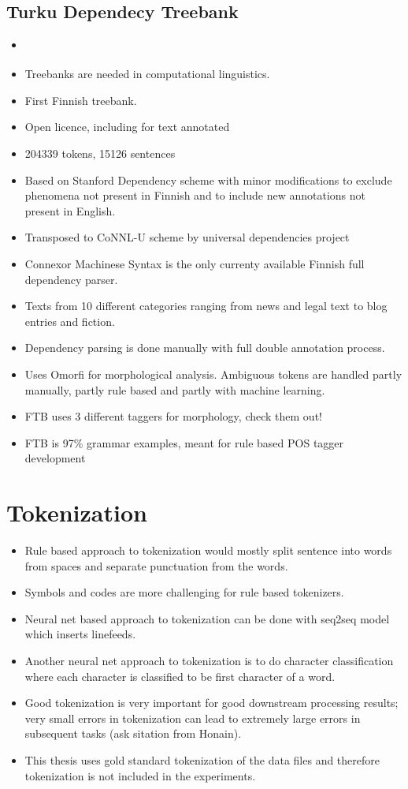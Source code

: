\documentclass[12pt,a4paper,english
]{tutthesis}
\begin{document}
\subsection{Turku Dependecy Treebank}
\label{ss:turku_dependency_treebank}
\begin{itemize}
\item \cite{Haverinen2014}
\item Treebanks are needed in computational linguistics.
\item First Finnish treebank.
\item Open licence, including for text annotated
\item 204339 tokens, 15126 sentences
\item Based on Stanford Dependency scheme with minor modifications to exclude phenomena not present in Finnish and to include new annotations not present in English.
\item Transposed to CoNNL-U scheme by universal dependencies project
\item Connexor Machinese Syntax is the only currenty available Finnish full dependency parser.
\item Texts from 10 different categories ranging from news and legal text to blog entries and fiction.
\item Dependency parsing is done manually with full double annotation process.
\item Uses Omorfi for morphological analysis. Ambiguous tokens are handled partly manually, partly rule based and partly with machine learning.
\item FTB uses 3 different taggers for morphology, check them out!
\item FTB is 97\% grammar examples, meant for rule based POS tagger development
\end{itemize}

\section{Tokenization}
\begin{itemize}
\item Rule based approach to tokenization would mostly split sentence into words from spaces and separate punctuation from the words.
\item Symbols and codes are more challenging for rule based tokenizers.
\item Neural net based approach to tokenization can be done with seq2seq model which inserts linefeeds.
\item Another neural net approach to tokenization is to do character classification where each character is classified to be first character of a word.
\item Good tokenization is very important for good downstream processing results; very small errors in tokenization can lead to extremely large errors in subsequent tasks (ask sitation from Honain). 
\item This thesis uses gold standard tokenization of the data files and therefore tokenization is not included in the experiments. 
\end{itemize}
\end{document}
